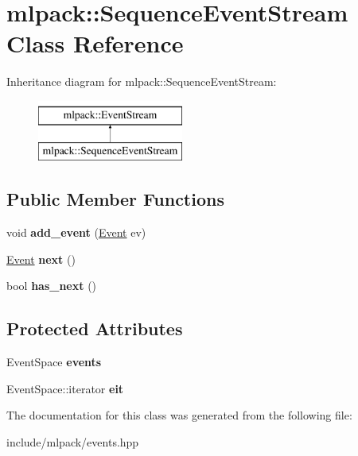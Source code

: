 \hypertarget{classmlpack_1_1_sequence_event_stream}{
\section{mlpack::SequenceEventStream Class Reference}
\label{classmlpack_1_1_sequence_event_stream}
}
Inheritance diagram for mlpack::SequenceEventStream:\begin{figure}[H]
\begin{center}
\leavevmode
\includegraphics[height=2.000000cm]{classmlpack_1_1_sequence_event_stream}
\end{center}
\end{figure}
\subsection*{Public Member Functions}
\begin{DoxyCompactItemize}
\item 
\hypertarget{classmlpack_1_1_sequence_event_stream_ae6422ba56e4c8f84960c74c2bee8f757}{
void {\bfseries add\_\-event} (\hyperlink{structmlpack_1_1_event}{Event} ev)}
\label{classmlpack_1_1_sequence_event_stream_ae6422ba56e4c8f84960c74c2bee8f757}

\item 
\hypertarget{classmlpack_1_1_sequence_event_stream_aabea2d7fea55cf3d755d8ee6829470c0}{
\hyperlink{structmlpack_1_1_event}{Event} {\bfseries next} ()}
\label{classmlpack_1_1_sequence_event_stream_aabea2d7fea55cf3d755d8ee6829470c0}

\item 
\hypertarget{classmlpack_1_1_sequence_event_stream_ac4e3f481db6538917745f4cd99722ec1}{
bool {\bfseries has\_\-next} ()}
\label{classmlpack_1_1_sequence_event_stream_ac4e3f481db6538917745f4cd99722ec1}

\end{DoxyCompactItemize}
\subsection*{Protected Attributes}
\begin{DoxyCompactItemize}
\item 
\hypertarget{classmlpack_1_1_sequence_event_stream_ad88d2af30e2d8e5beced9467e4146722}{
EventSpace {\bfseries events}}
\label{classmlpack_1_1_sequence_event_stream_ad88d2af30e2d8e5beced9467e4146722}

\item 
\hypertarget{classmlpack_1_1_sequence_event_stream_a1641e54080e52343acc5ae0a36c20ba7}{
EventSpace::iterator {\bfseries eit}}
\label{classmlpack_1_1_sequence_event_stream_a1641e54080e52343acc5ae0a36c20ba7}

\end{DoxyCompactItemize}


The documentation for this class was generated from the following file:\begin{DoxyCompactItemize}
\item 
include/mlpack/events.hpp\end{DoxyCompactItemize}
